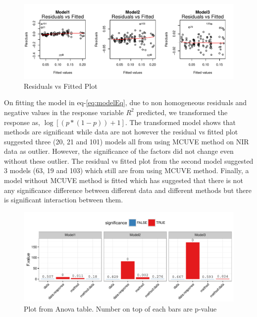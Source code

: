 \documentclass[10pt, a4paper]{article}\usepackage[]{graphicx}\usepackage[]{color}
\makeatletter
\def\maxwidth{ %
  \ifdim\Gin@nat@width>\linewidth
    \linewidth
  \else
    \Gin@nat@width
  \fi
}
\newenvironment{knitrout}{}{} %
\makeatother
\begin{document}
\begin{knitrout}\small
{}\color{fgcolor}\begin{figure}[H]
\includegraphics[width=\maxwidth]{figure/rvfPlot-1} \caption[Residuals vs Fitted Plot]{Residuals vs Fitted Plot}\label{fig:rvfPlot}
\end{figure}


\end{knitrout}

On fitting the model in eq-\ref{eq:modelEq}, due to non homogeneous residuals and negative values in the response variable $R^2$ predicted, we transformed the response as, $\log\left[(p * (1 - p)) + 1\right]$. The transformed model shows that methods are significant while data are not however the residual vs fitted plot suggested three (20, 21 and 101) models all from using MCUVE method on NIR data as outlier. However, the significance of the factors did not change even without these outlier. The residual vs fitted plot from the second model suggested 3 models (63, 19 and 103) which still are from using MCUVE method. Finally, a model without MCUVE method is fitted which has suggested that there is not any significance difference between different data and different methods but there is significant interaction between them.


\begin{knitrout}\small
{}\color{fgcolor}\begin{figure}[H]
\includegraphics[width=\maxwidth]{figure/anovaPlot-1} \caption[Plot from Anova table]{Plot from Anova table. Number on top of each bars are p-value}\label{fig:anovaPlot}
\end{figure}


\end{knitrout}
\end{document}
